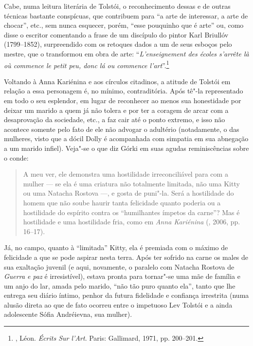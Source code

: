 Cabe, numa leitura literária de Tolstói, o reconhecimento dessas e de
outras técnicas bastante conspícuas, que contribuem para
``a arte de interessar, a arte de chocar'', etc., sem nunca esquecer,
porém, ``esse pouquinho que é arte'' ou, como disse o escritor
comentando a frase de um discípulo do pintor Karl
Briullóv (1799--1852), surpreendido com os retoques dados
a um de seus esboços pelo mestre, que o transformou em obra de arte:
``\emph{L'enseignement des écoles s'arrête là où commence \emph{le petit
peu}, donc lá ou commence l'art}''.\footnote{, Léon. \emph{Écrits Sur l'Art}. Paris: Gallimard, 1971, pp. 200--201.}

Voltando à Anna Kariénina e aos círculos citadinos, a atitude de
Tolstói em relação a essa personagem é, no mínimo, contraditória. Após
tê"-la representado em todo o seu esplendor, em lugar de reconhecer ao
menos sua honestidade por deixar um marido a quem já não tolera e
por ter a coragem de arcar com a desaprovação da sociedade, etc., a faz
cair até o ponto extremo, e isso não acontece somente pelo fato de ele
não advogar o adultério (notadamente, o das mulheres, visto que a dócil
Dolly é acompanhada com simpatia em sua abnegação a um marido infiel).
Veja"-se o que diz Górki em suas agudas reminiscências sobre o conde:

\begin{quotation}
A meu ver, ele demonstra uma hostilidade irreconciliável para com a
mulher --- se ela é uma criatura não totalmente limitada, não uma Kitty
ou uma Natacha Rostova ---, e gosta de puni"-la. Será a hostilidade do
homem que não soube haurir tanta felicidade quanto poderia ou a
hostilidade do espírito contra os ``humilhantes ímpetos da carne''? Mas é
hostilidade e uma hostilidade fria, como em \emph{Anna Kariénina} (, 2006, pp. 16--17).
\end{quotation}

Já, no campo, quanto à ``limitada'' Kitty, ela é premiada com o
máximo de felicidade a que se pode aspirar nesta terra.
Após ter sofrido na carne os males de sua exaltação juvenil (e aqui,
novamente, o paralelo com Natacha Rostova de \emph{Guerra e paz} é
irresistível), estava pronta para tornar"-se uma mãe de família e um anjo do lar,
amada pelo marido, ``não tão puro quanto ela'', tanto que lhe entrega seu diário
íntimo, penhor da futura fidelidade e confiança irrestrita (numa alusão
direta ao que de fato ocorreu entre o impetuoso Lev Tolstói e a ainda
adolescente Sófia Andréievna, sua mulher).

